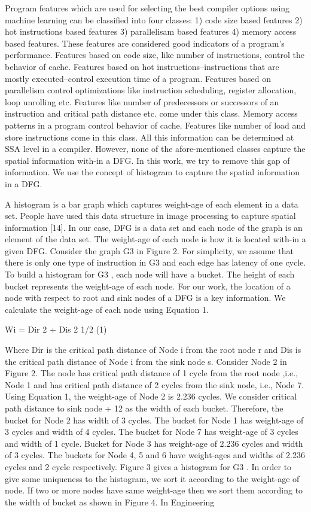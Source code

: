 \documentclass[conference]{IEEEtran}
\begin{document}
Program features which are used for selecting the best compiler options using machine learning can be classified into four classes: 1) code size based features 2) hot instructions based features 3) parallelisam based features 4) memory access based features. These features are
considered good indicators of a program’s performance. Features based on code size, like number of instructions, control the behavior of cache. Features based on hot instructions–instructions that are mostly executed–control execution time of a program. Features based on parallelism control optimizations like instruction scheduling, register allocation, loop unrolling etc. Features like number of predecessors or successors of an instruction and critical path distance etc. come under this class. Memory access patterns in a program control behavior of cache. Features like number of load and store instructions come in this class. All this information can be determined at SSA level in a compiler. However, none of the afore-mentioned classes capture the spatial information with-in a DFG. In this work, we try to remove this gap of
information. We use the concept of histogram to capture the spatial information in a DFG.


A histogram is a bar graph which captures weight-age of each element in a data set. People have used this data structure in image processing to capture spatial information [14]. In our case, DFG is a data set and each node of the graph is an element of the data set. The weight-age of each node is how it is located with-in a given DFG. Consider the graph G3 in Figure 2. For simplicity, we assume that there is only one type of instruction in G3 and each edge has latency of one cycle. To build a histogram for G3 , each node will have a bucket. The height of each bucket represents the weight-age of each node. For our work, the location of a node with respect to root and sink nodes of a DFG is a key information.
We calculate the weight-age of each node using Equation 1.\pra

Wi = {Dir 2 + Dis 2 }1/2 (1)

Where Dir is the critical path distance of Node i from the root node r and Dis is the critical path distance of Node i from the sink node s. Consider Node 2 in Figure 2. The node has critical path distance of 1 cycle from the root node ,i.e., Node 1 and has critical path distance of 2 cycles from the sink node, i.e., Node 7. Using Equation 1, the weight-age of Node 2 is 2.236 cycles. We consider critical path distance to sink node + 12 as the width of each bucket. Therefore, the bucket for Node 2 has width of 3 cycles. The bucket for Node 1 has weight-age of 3 cycles and width of 4 cycles. The bucket for Node 7 has weight-age of 3 cycles and width of 1 cycle. Bucket for Node 3 has weight-age of 2.236 cycles and width of 3 cycles. The buckets for Node 4, 5 and 6 have weight-ages and widths of 2.236 cycles and 2 cycle respectively. Figure 3 gives a histogram for G3 . In order to give some uniqueness to the histogram, we sort it according to the weight-age of node. If two or more
nodes have same weight-age then we sort them according to the width of bucket as shown in Figure 4. In Engineering
\end{document}
